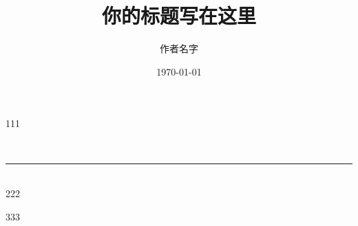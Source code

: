 \documentclass[UTF8]{ctexart}
\title{你的标题写在这里}
\author{作者名字}
\date{\today}
\begin{document}
	\tableofcontents %
	\maketitle  %


111

~\\
\hrule
~\\

222



333
\end{document}
